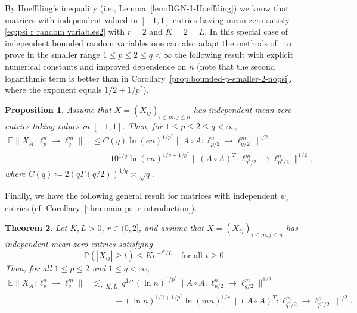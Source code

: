 \documentclass[a4paper]{amsart}
\newtheorem{theorem}{Theorem}[section]
\newtheorem{proposition}[theorem]{Proposition} %
\theoremstyle{definition}
\theoremstyle{remark}
\numberwithin{equation}{section}
\newcommand*{\EE}{\mathbb{E}}
\newcommand*{\PP}{\mathbb{P}}
\newcommand*{\hadprod}{\mathbin{\circ}} %
\begin{document}
By Hoeffding's inequality (i.e., Lemma~\ref{lem:BGN-1-Hoeffding}) we know that matrices with independent valued in $[-1,1]$  entries having  mean zero satisfy \eqref{eq:psi r random variables2} with $r=2$ and $K=2=L$.
In this special case of independent bounded random variables
 one can also adapt the methods of~\cite{BGN}
to prove in the smaller range $1\leq p\leq 2 \leq q < \infty$ the following result  with explicit numerical constants
and improved dependence on $n$
(note that the second logarithmic term is better than in Corollary~\ref{prop:bounded-p-smaller-2-nopsi}, where the exponent equals $1/2+1/p^*$).

\begin{proposition}
	\label{prop:bdd-p-2-q-OLD}
	Assume that $X=(X_{ij})_{i\leq m, j\leq n}$ has independent mean-zero entries taking values in $[-1,1]$.
	Then, for $1\leq p\leq 2\leq q< \infty$,
	\begin{align*}
	\EE \|X_A \colon \ell^n_p\to \ell^m_q\|
	& \leq C(q) \ln(en)^{1/p^*} \|A\hadprod A \colon \ell^n_{p/2} \to \ell^m_{q/2}\|^{1/2}  \\
	&\quad + 10^{1/q} \ln(en)^{1/q+1/p^*}  \|(A\hadprod A)^T \colon \ell^m_{q^*/2} \to \ell^n_{p^*/2}\|^{1/2} ,
	\end{align*}
	where $C(q) \coloneqq  2 (q\Gamma(q/2))^{1/q} \asymp \sqrt q$.
\end{proposition}




Finally, we have the following general result for matrices with independent $\psi_r$ entries
(cf. Corollary~\ref{thm:main-psi-r-introduction}).

\begin{theorem}
	\label{thm:psi-p<2}
	Let $K,L>0$, $r\in(0,2]$,	 and assume that	$X=(X_{ij})_{i\leq m, j\leq n}$ has independent mean-zero entries satisfying
		\[
		\PP(|X_{ij}|\ge t) \le Ke^{-t^r/L} \quad \text{for all } t\ge 0.
		\]
			Then, for all $1\leq p\leq 2$ and $1\leq q< \infty$,
	\begin{align*}
	\EE \|X_A \colon \ell^n_p\to \ell^m_q\|
	&\lesssim_{r,K,L} \   q^{1/r} (\ln n)^{1/p^*}  \|A\hadprod A \colon \ell^n_{p/2} \to \ell^m_{q/2}\|^{1/2}\\
	 &\qquad\ \ \ + (\ln n)^{1/2+1/p^*} \ln (mn)^{1/r}  \|(A\hadprod A)^T \colon \ell^m_{q^*/2} \to \ell^n_{p^*/2}\|^{1/2}.
	\end{align*}
\end{theorem}
\end{document}
